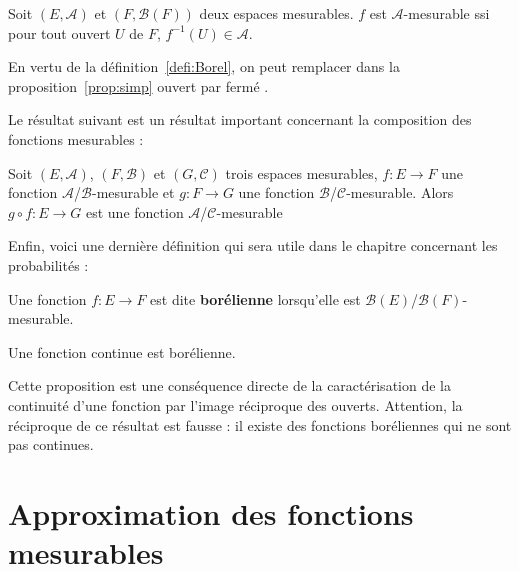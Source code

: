 \documentclass[../integ-proba.tex]{subfiles}
\begin{document}
  \begin{prop}
    \label{prop:simp}
    Soit $\left(E, \mathcal{A}\right)$ et $\left(F, \mathcal{B}(F)\right)$ deux espaces mesurables.
    $f$ est $\mathcal{A}$-mesurable ssi pour tout ouvert $U$ de $F$, $f^{-1}(U) \in \mathcal{A}$.
  \end{prop}

  \begin{rem}
    En vertu de la définition~\ref{defi:Borel}, on peut remplacer dans la proposition~\ref{prop:simp} \og ouvert \fg par \og fermé \fg.
  \end{rem}

  Le résultat suivant est un résultat important concernant la composition des fonctions mesurables :

  \begin{prop}
    Soit $\left(E,\mathcal{A}\right)$, $\left(F,\mathcal{B}\right)$ et $\left(G,\mathcal{C}\right)$ trois espaces mesurables,
    $f : E \longrightarrow F$ une fonction $\mathcal{A}$/$\mathcal{B}$-mesurable et $g : F \longrightarrow G$ une fonction $\mathcal{B}$/$\mathcal{C}$-mesurable.
    Alors $g \circ f : E \longrightarrow G$ est une fonction $\mathcal{A}$/$\mathcal{C}$-mesurable
  \end{prop}

  Enfin, voici une dernière définition qui sera utile dans le chapitre concernant les probabilités :

  \begin{defi}
    Une fonction $f:E\longrightarrow F$ est dite \textbf{borélienne} lorsqu'elle est $\mathcal{B}(E)$/$\mathcal{B}(F)$-mesurable.
  \end{defi}

  \begin{prop}
    \label{prop:continue_implique_borelienne}
    Une fonction continue est borélienne.
  \end{prop}

  \begin{rem}
    Cette proposition est une conséquence directe de la caractérisation de la continuité d'une fonction par l'image réciproque des ouverts.
    Attention, la réciproque de ce résultat est fausse : il existe des fonctions boréliennes qui ne sont pas continues.
  \end{rem}


  \section{Approximation des fonctions mesurables}
\end{document}
